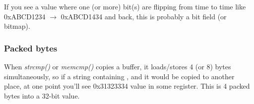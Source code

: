 If you see a value where one (or more) bit(s) are flipping from time to time like 0xABCD1234 $\rightarrow$ 0xABCD1434 and back,
this is probably a bit field (or bitmap).

\subsubsection{Packed bytes}

When \emph{strcmp()} or \emph{memcmp()} copies a buffer, it loads/stores 4 (or 8) bytes simultaneously,
so if a string containing , and it would be copied to another place,
at one point you'll see 0x31323334 value in some register.
This is 4 packed bytes into a 32-bit value.

